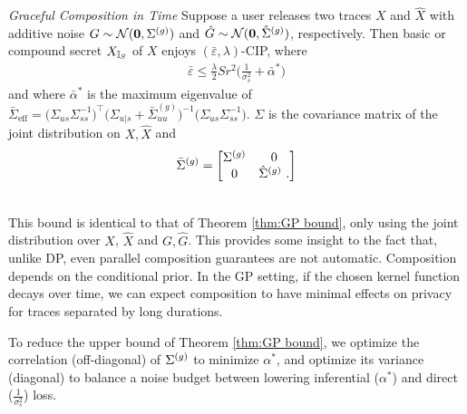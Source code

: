 \begin{corollary}\emph{Graceful Composition in Time}
\label{cor: composition}
	Suppose a user releases two traces $X$ and $\hat{X}$ with additive noise $G \sim \mathcal{N}(\mathbf{0}, \Sigma^{(g)})$ and $\hat{G} \sim \mathcal{N}(\mathbf{0}, \hat{\Sigma}^{(g)})$, respectively. Then basic or compound secret ${X_{\mathbb{I}_S}}$ of $X$ enjoys $(\bar{\varepsilon}, \lambda)$-CIP, where 
	\begin{align*}
		\bar{\varepsilon} \leq \frac{\lambda}{2} S r^2 \Big(  \frac{1 }{\sigma_s^2} + \bar{\alpha}^*  \Big) 
	\end{align*}
	and where $\bar{\alpha}^*$ is the maximum eigenvalue of $\bar{\Sigma}_{\text{eff}} = \big(\Sigma_{us} \Sigma_{ss}^{-1}\big)^\intercal \big( \Sigma_{u | s} + \bar{\Sigma}_{uu}^{(g)} \big)^{-1} \big(\Sigma_{us} \Sigma_{ss}^{-1}\big)$. $\Sigma$ is the covariance matrix of the joint distribution on $X, \hat{X}$ and 
	\begin{align*}
	\bar{\Sigma}^{(g)} =
		\begin{bmatrix}
			 \Sigma^{(g)} & 0 \\
			 0 &  \hat{\Sigma}^{(g)} \ .
		\end{bmatrix}
	\end{align*}
\end{corollary}
\text{ } \vspace{2mm} \\
This bound is identical to that of Theorem \ref{thm:GP bound}, only using the joint distribution over $X$, $\hat{X}$ and $G, \hat{G}$. This provides some insight to the fact that, unlike DP, even parallel composition guarantees are not automatic. Composition depends on the conditional prior. In the GP setting, if the chosen kernel function decays over time, we can expect composition to have minimal effects on privacy for traces separated by long durations. 

To reduce the upper bound of Theorem \ref{thm:GP bound}, we optimize the correlation (off-diagonal) of $\Sigma^{(g)}$ to minimize $\alpha^*$, and optimize its variance (diagonal) to balance a noise budget between lowering inferential ($\alpha^*$) and direct ($\frac{1}{\sigma_s^2}$) loss.